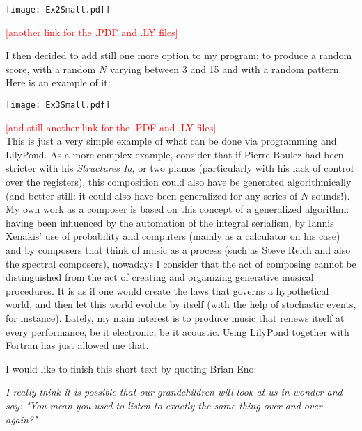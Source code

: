 \documentclass{article}
\begin{document}
\texttt{[image: Ex2Small.pdf]}

\textcolor{red}{[another link for the .PDF and .LY files]}

I then decided to add still one more option to my program: to produce a random score, with a random $N$ varying
between 3 and 15 and with a random pattern. 
Here is an example of it:

\texttt{[image: Ex3Small.pdf]}

\textcolor{red}{[and still another link for the .PDF and .LY files]} \\

This is just a very simple example of what can be done via programming and LilyPond. 
As a more complex example, consider that if Pierre Boulez had been stricter with his \textit{Structures Ia}, 
or two pianos (particularly with his lack of control over the registers), this composition could also have be
generated algorithmically (and better still: it could also have been generalized for any series of $N$ sounds!). 
My own work as a composer is based on this concept of a generalized algorithm: 
having been influenced by the automation of the integral serialism, by Iannis Xenakis' use of probability and
computers (mainly as a calculator on his case) and by composers that think of music as a process (such as Steve
Reich and also the spectral composers), nowadays I consider that the act of composing cannot be distinguished from
the act of creating and organizing generative musical procedures. 
It is as if one would create the laws that governs a hypothetical world, and then let this world evolute by
itself (with the help of stochastic events, for instance). 
Lately, my main interest is to produce music that renews itself at every performance, be it electronic,
be it acoustic. 
Using LilyPond together with Fortran has just allowed me that.

I would like to finish this short text by quoting Brian Eno:

\textit{I really think it is possible that our grandchildren will look at us in wonder and say:
"You mean you used to listen to exactly the same thing over and over again?"}
\end{document}
